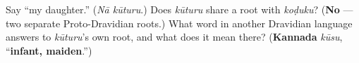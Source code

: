 \begin{tcolorbox}[breakable,colback=teal!4,colframe=teal!35!black,title={Before you move on}]
Say \textquotedblleft{}my daughter.\textquotedblright{} (\emph{Nā kūturu}.) Does \emph{kūturu} share a root with \emph{koḍuku}? (\textbf{No} — two separate Proto-Dravidian roots.) What word in another Dravidian language answers to \emph{kūturu}'s own root, and what does it mean there? (\textbf{Kannada } \emph{kūsu}, \textquotedblleft{}\textbf{infant, maiden}.\textquotedblright{})
\end{tcolorbox}
